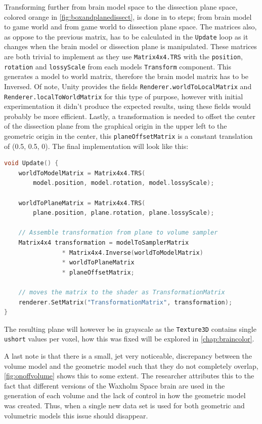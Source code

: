 Transforming further from brain model space to the dissection plane space, colored orange in \autoref{fig:boxandplanedissect}, is done in to steps; from brain model to game world and from game world to dissection plane space. The matrices also, as oppose to the previous matrix, has to be calculated in the \texttt{Update} loop as it changes when the brain model or dissection plane is manipulated. These matrices are both trivial to implement as they use \texttt{Matrix4x4.TRS} with the \texttt{position}, \texttt{rotation} and \texttt{lossyScale} from each models \texttt{Transform} component.  This generates a model to world matrix, therefore the brain model matrix has to be Inversed. Of note, Unity provides the fields \texttt{Renderer.worldToLocalMatrix} and \texttt{Renderer.localToWorldMatrix} for this type of purpose, however with initial experimentation it didn't produce the expected results, using these fields would probably be more efficient. Lastly, a transformation is needed to offset the center of the dissection plane from the graphical origin in the upper left to the geometric origin in the center, this \texttt{planeOffsetMatrix} is a constant translation of (0.5, 0.5, 0). The final implementation will look like this:
\begin{lstlisting}[language=c++]
void Update() {
    worldToModelMatrix = Matrix4x4.TRS(
        model.position, model.rotation, model.lossyScale);

    worldToPlaneMatrix = Matrix4x4.TRS(
        plane.position, plane.rotation, plane.lossyScale);

    // Assemble transformation from plane to volume sampler
    Matrix4x4 transformation = modelToSamplerMatrix 
                * Matrix4x4.Inverse(worldToModelMatrix)
                * worldToPlaneMatrix
                * planeOffsetMatrix;

    // moves the matrix to the shader as TransformationMatrix
    renderer.SetMatrix("TransformationMatrix", transformation);
}
\end{lstlisting}
The resulting plane will however be in grayscale as the \texttt{Texture3D} contains single \texttt{ushort} values per voxel, how this was fixed will be explored in \autoref{chap:braincolor}.

A last note is that there is a small, jet very noticeable, discrepancy between the volume model and the geometric model such that they do not completely overlap, \autoref{fig:onoffvolume} shows this to some extent. The researcher attributes this to the fact that different versions of the Waxholm Space brain are used in the generation of each volume and the lack of control in how the geometric model was created. Thus, when a single new data set is used for both geometric and volumetric models this issue should disappear.

